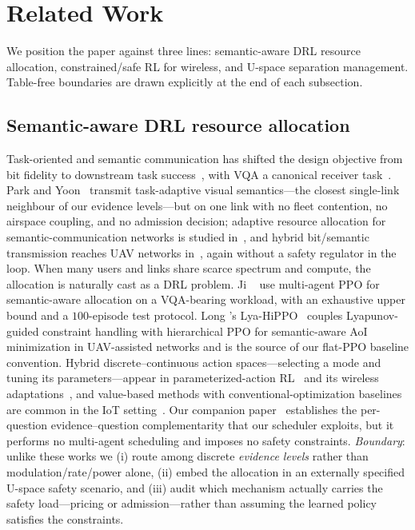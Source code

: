 \section{Related Work}\label{sec:related}

We position the paper against three lines: semantic-aware DRL resource
allocation, constrained/safe RL for wireless, and U-space separation
management. Table-free boundaries are drawn explicitly at the end of each
subsection.

\subsection{Semantic-aware DRL resource allocation}
Task-oriented and semantic communication has shifted the design objective
from bit fidelity to downstream task success~\cite{gunduz2023beyond,
xie2021deepsc}, with VQA a canonical receiver
task~\cite{xie2021mudeepsc,liu2024gosg}. Park and
Yoon~\cite{park2025transmit} transmit task-adaptive visual semantics---the
closest single-link neighbour of our evidence levels---but on one link with
no fleet contention, no airspace coupling, and no admission decision;
adaptive resource allocation for semantic-communication networks is studied
in~\cite{wang2023parameterized}, and hybrid bit/semantic transmission
reaches UAV networks in~\cite{li2026hybrid}, again without a safety
regulator in the loop. When many users and links share scarce spectrum and
compute, the allocation is naturally cast as a DRL problem. Ji
\etal~\cite{ji2024semantic} use multi-agent PPO for semantic-aware
allocation on a VQA-bearing workload, with an exhaustive upper bound and a
$100$-episode test protocol. Long \etal's
Lya-HiPPO~\cite{long2025lyahippo} couples Lyapunov-guided constraint
handling with hierarchical PPO for semantic-aware AoI minimization in
UAV-assisted networks and is the source of our flat-PPO baseline
convention. Hybrid discrete--continuous action spaces---selecting a mode
and tuning its parameters---appear in parameterized-action
RL~\cite{masson2016padrl} and its wireless
adaptations~\cite{huang2024hybrid}, and value-based methods with
conventional-optimization baselines are common in the IoT
setting~\cite{shao2024value}. Our companion
paper~\cite{zhang2026askb4tx} establishes the per-question
evidence--question complementarity that our scheduler exploits, but it
performs no multi-agent scheduling and imposes no safety constraints.
\emph{Boundary}: unlike these works we (i) route among discrete
\emph{evidence levels} rather than modulation/rate/power alone, (ii) embed
the allocation in an externally specified U-space safety scenario, and
(iii) audit which mechanism actually carries the safety load---pricing or
admission---rather than assuming the learned policy satisfies the
constraints.

